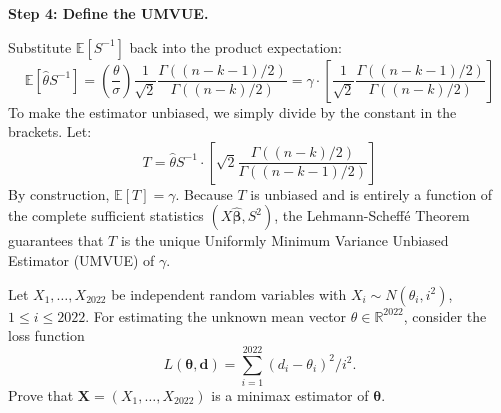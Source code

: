 \begin{solution}
\textbf{Step 4: Define the UMVUE.}

Substitute $\mathbb{E}[S^{-1}]$ back into the product expectation:
\[ \mathbb{E}[\hat{\theta} S^{-1}] = \left( \frac{\theta}{\sigma} \right) \frac{1}{\sqrt{2}} \frac{\Gamma((n-k-1)/2)}{\Gamma((n-k)/2)} = \gamma \cdot \left[ \frac{1}{\sqrt{2}} \frac{\Gamma((n-k-1)/2)}{\Gamma((n-k)/2)} \right] \]
To make the estimator unbiased, we simply divide by the constant in the brackets. Let:
\[ T = \hat{\theta} S^{-1} \cdot \left[ \sqrt{2} \frac{\Gamma((n-k)/2)}{\Gamma((n-k-1)/2)} \right] \]
By construction, $\mathbb{E}[T] = \gamma$. 
Because $T$ is unbiased and is entirely a function of the complete sufficient statistics $(X\hat{\boldsymbol{\beta}}, S^2)$, the Lehmann-Scheffé Theorem guarantees that $T$ is the unique Uniformly Minimum Variance Unbiased Estimator (UMVUE) of $\gamma$.
\end{solution}

\begin{exercise}\label{probability:2021:6}
Let $X_1, \dots, X_{2022}$ be independent random variables with $X_i \sim N(\theta_i, i^2)$, $1 \leq i \leq 2022$. For estimating the unknown mean vector $\theta \in \mathbb{R}^{2022}$, consider the loss function
\[
L(\boldsymbol{\theta}, \mathbf{d}) = \sum_{i=1}^{2022} (d_i - \theta_i)^2 / i^2.
\]
Prove that $\mathbf{X} = (X_1, \dots, X_{2022})$ is a minimax estimator of $\boldsymbol{\theta}$.
\end{exercise}

